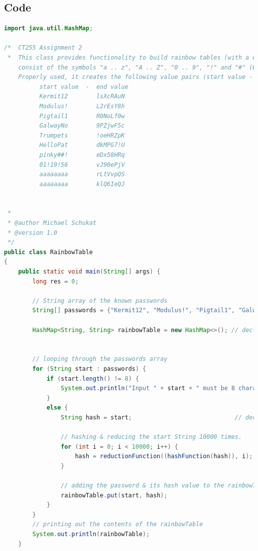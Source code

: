 \documentclass[a4paper]{article}
\begin{document}
\subsection{Code}
\begin{lstlisting}[language=Java]
import java.util.HashMap;

/*  CT255 Assignment 2
 *  This class provides functionality to build rainbow tables (with a different reduction function per round) for 8 character long strings, which
    consist of the symbols "a .. z", "A .. Z", "0 .. 9", "!" and "#" (64 symbols in total).
    Properly used, it creates the following value pairs (start value - end value) after 10,000 iterations of hashFunction() and reductionFunction():
          start value  -  end value
          Kermit12        lsXcRAuN
          Modulus!        L2rEsY8h
          Pigtail1        R0NoLf0w
          GalwayNo        9PZjwF5c
          Trumpets        !oeHRZpK
          HelloPat        dkMPG7!U
          pinky##!        eDx58HRq
          01!19!56        vJ90ePjV
          aaaaaaaa        rLtVvpQS
          aaaaaaaa        klQ6IeQJ
          
          
 *
 * @author Michael Schukat
 * @version 1.0
 */
public class RainbowTable
{
    public static void main(String[] args) {
		long res = 0;

        // String array of the known passwords
        String[] passwords = {"Kermit12", "Modulus!", "Pigtail1", "GalwayNo", "Trumpets", "HelloPat", "pinky##!", "01!19!56", "aaaaaaaa", "aaaaaaaa"};

        HashMap<String, String> rainbowTable = new HashMap<>(); // declaring a HashTable that i'll use to store the password : hash pairs


        // looping through the passwords array
		for (String start : passwords) {
            if (start.length() != 8) {
                System.out.println("Input " + start + " must be 8 characters long - Exit");
            }
            else {
                String hash = start;                             // declaring a String hash that will hold the final reduced hash of a given password

                // hashing & reducing the start String 10000 times.
                for (int i = 0; i < 10000; i++) {
                    hash = reductionFunction((hashFunction(hash)), i);
                }

                // adding the password & its hash value to the rainbowTable HashMap
                rainbowTable.put(start, hash);
            }
        }
        // printing out the contents of the rainbowTable
        System.out.println(rainbowTable);
	}
        

\end{lstlisting}
\end{document}
